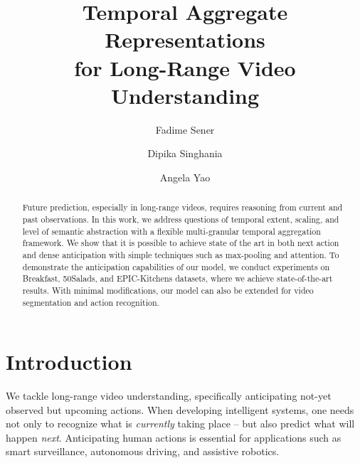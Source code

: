 \documentclass[runningheads]{llncs}
\begin{document}
\pagestyle{headings}
\mainmatter
\def\ECCVSubNumber{2515} 

\title{Temporal Aggregate Representations\\
for Long-Range Video Understanding} 


\author{Fadime Sener \and
Dipika Singhania\and
Angela Yao}
\maketitle

\begin{abstract}
Future prediction, especially in long-range videos, requires reasoning from current and past observations. In this work, we address questions of temporal extent, scaling, and level of semantic abstraction with a flexible multi-granular temporal aggregation framework.  We show that it is possible to achieve state of the art in both next action and dense anticipation with simple techniques such as max-pooling and attention. To demonstrate the anticipation capabilities of our model, we conduct experiments on Breakfast, 50Salads, and EPIC-Kitchens datasets, where we achieve state-of-the-art results.  With minimal modifications, our model can also be extended for video segmentation and action recognition.
\end{abstract}
 
\section{Introduction}
We tackle long-range video understanding, specifically anticipating not-yet observed but upcoming actions. When developing intelligent systems, one needs not only to recognize what is \emph{currently} taking place -- but also predict what will happen \emph{next}. Anticipating human actions is essential for applications such as smart surveillance, autonomous driving, and assistive robotics. 
 
\end{document}
